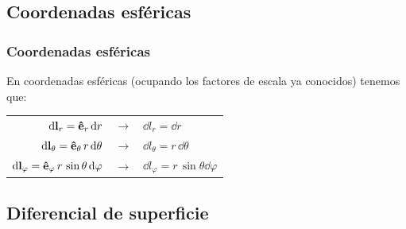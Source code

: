 \documentclass[12pt]{beamer}
\begin{document}
\subsection*{Coordenadas esféricas}

\begin{frame}
\frametitle{Coordenadas esféricas}
En coordenadas esféricas (ocupando los factores de escala ya conocidos) tenemos que:
\pause
\begin{table}
\begin{tabular}{r  c  l}
$\dd{\vb{l}_{r}} = \vu{e}_{r} \dd{r}$ & $\longrightarrow$ & $\dd{l_{r}} = \dd{r}$ \\
$\dd{\vb{l}_{\theta}} = \vu{e}_{\theta} \, r \dd{\theta}$ & $\longrightarrow$ & $\dd{l_{\theta}} = r \, \dd{\theta}$ \\
$\dd{\vb{l}_{\varphi}} = \vu{e}_{\varphi} \, r \, \sin \theta \dd{\varphi}$ & $\longrightarrow$ & $\dd{l_{\varphi}} = r \, \sin \theta \dd{\varphi}$ \\
\end{tabular}
\end{table}
\end{frame}

\subsection{Diferencial de superficie}
\end{document}
